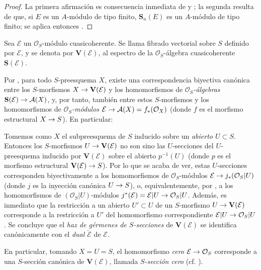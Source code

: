 \documentclass[oneside,10pt]{amsart}
\makeatletter
\newcommand{\ega@arrow}[2]{\mathchoice{#1}{#2}{#2}{#2}}
\renewcommand{\to}{\ega@arrow{\longrightarrow}{\rightarrow}}
\newcommand{\oldpage}[2][]{\marginnote{\normalfont\footnotesize\textbf{#1}~|~#2}\ignorespaces}
\let\EGAOriginalLabel\label
\renewcommand{\label}[1]{\phantomsection\EGAOriginalLabel{#1}}
\makeatother
\begin{document}
\begin{proof}
La primera afirmación es consecuencia inmediata de  y ; la segunda resulta de que, si $E$ es un $A$-módulo de tipo finito, $\mathbf{S}_n(E)$ es un $A$-módulo de tipo finito; se aplica entonces .
\end{proof}

\begin{definition}[1.7.8]
\label{II.1.7.8-fr}
Sea $\mathcal{E}$ un $\mathcal{O}_S$-módulo cuasicoherente.
Se llama fibrado vectorial sobre $S$ definido por $\mathcal{E}$, y se denota por $\mathbf{V}(\mathcal{E})$, al espectro  de la $\mathcal{O}_S$-álgebra cuasicoherente $\mathbf{S}(\mathcal{E})$.
\end{definition}

Por , para todo $S$-preesquema $X$, existe una correspondencia biyectiva canónica entre los $S$-morfismos $X\to\mathbf{V}(\mathcal{E})$ y los homomorfismos de \emph{$\mathcal{O}_S$-álgebras $\mathbf{S}(\mathcal{E})\to\mathcal{A}(X)$}, y, por tanto, también entre estos $S$-morfismos y los homomorfismos de \emph{$\mathcal{O}_S$-módulos $\mathcal{E}\to\mathcal{A}(X)=f_*(\mathcal{O}_X)$} (donde $f$ es el morfismo estructural $X\to S$).
En particular:

\begin{env}[1.7.9]
\label{II.1.7.9-fr}
Tomemos como $X$ el subpreesquema de $S$ inducido sobre un \emph{abierto $U\subset S$}.
Entonces los $S$-morfismos $U\to\mathbf{V}(\mathcal{E})$ no son sino las $U$-secciones  del $U$-preesquema inducido por $\mathbf{V}(\mathcal{E})$ sobre el abierto $p^{-1}(U)$ (donde $p$ es el morfismo estructural $\mathbf{V}(\mathcal{E})\to S$).
Por lo que se acaba de ver, estas $U$-secciones corresponden biyectivamente a los homomorfismos de $\mathcal{O}_S$-módulos $\mathcal{E}\to j_*(\mathcal{O}_S|U)$ (donde $j$ es la inyección canónica $U\to S$), o,
\oldpage[II]{17}
equivalentemente, por , a los homomorfismos de $(\mathcal{O}_S|U)$-módulos $j^*(\mathcal{E})=\mathcal{E}|U\to\mathcal{O}_S|U$.
Además, es inmediato que la restricción a un abierto $U'\subset U$ de un $S$-morfismo $U\to\mathbf{V}(\mathcal{E})$ corresponde a la restricción a $U'$ del homomorfismo correspondiente $\mathcal{E}|U\to\mathcal{O}_S|U$.
Se concluye que el \emph{haz de gérmenes de $S$-secciones} de $\mathbf{V}(\mathcal{E})$ se identifica canónicamente con el \emph{dual $\check{\mathcal{E}}$} de $\mathcal{E}$.

En particular, tomando $X=U=S$, el homomorfismo \emph{cero} $\mathcal{E}\to\mathcal{O}_S$ corresponde a una $S$-sección canónica de $\mathbf{V}(\mathcal{E})$, llamada \emph{$S$-sección cero} (cf. ).
\end{env}
\end{document}
